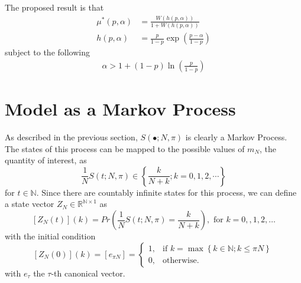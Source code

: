 \documentclass{article}
\newcommand{\N}{\mathbb{N}}
\newcommand{\R}{\mathbb{R}}
\newcommand{\sset}[1]{\left\{ #1 \right\}}
\newcommand{\ppar}[1]{\left( #1 \right)}
\newcommand{\spar}[1]{\left[ #1 \right]}
\begin{document}
The proposed result is that
\begin{align}
    {\mu^*}\ppar{p, \alpha} &= \frac{W\ppar{h\ppar{p, \alpha}}}{1+W\ppar{h\ppar{p, \alpha}}}
    \\
    h\ppar{p, \alpha} &=
    \frac{p}{1-p} \exp{\ppar{\frac{p-\alpha}{1-p}}}
\end{align}
subject to the following
\begin{align}
    \alpha > 1 + \ppar{1-p} \ln{\ppar{\frac{p}{1-p}}} 
\end{align}

\section{Model as a Markov Process}

As described in the previous section, $S(\bullet; N, \pi)$ is clearly a Markov Process.
%
The states of this process can be mapped to the possible values of $m_N$, the quantity of interest, as
\begin{equation}
    \frac{1}{N} S(t; N, \pi) \in \sset{\frac{k}{N+k}; k = 0, 1, 2, \cdots}
\end{equation}
for $t\in \N$. 
%
Since there are countably infinite states for this process, we can define a state vector $Z_N \in \R^{\N\times 1}$ as
\begin{equation}
    \spar{Z_N(t)}(k) = Pr\ppar{\frac{1}{N} S(t; N, \pi) = \frac{k}{N+k}}, \text{ for } k=0,,1, 2, \dots
\end{equation}
with the initial condition
\begin{equation}
    \spar{Z_N(0)}(k) = \spar{e_{\pi N}} = \begin{cases}
        1, &\text{if } k = \max\sset{k\in \N; k \leq \pi N} \\
        0, &\text{otherwise.}
    \end{cases}
\end{equation}
with $e_\tau$ the $\tau$-th canonical vector.
\end{document}
